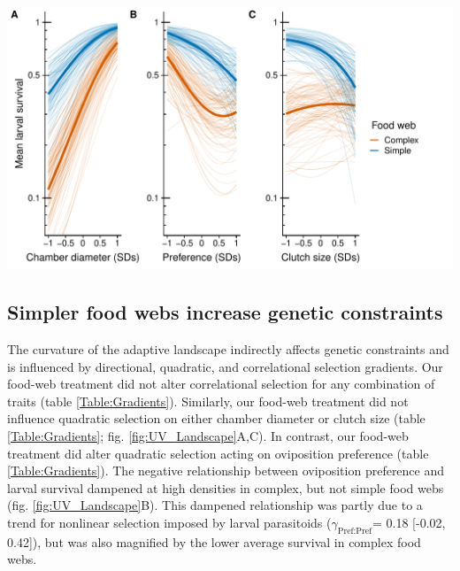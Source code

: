 \documentclass[11pt,]{article}
\let\origfigure\figure
\let\endorigfigure\endfigure
\renewenvironment{figure}[1][2] {
    \expandafter\origfigure\expandafter[H]
} {
    \endorigfigure
}
\begin{document}
\begin{figure}
\centering
\includegraphics{analyses/UV_landscapes.pdf}
\caption{\label{fig:UV_Landscape}Adaptive landscape of gall midge
phenotypes in complex vs.~simple food webs. Each panel corresponds to a
different phenotypic trait: chamber diameter (A); oviposition preference
(B); and clutch size (C). Bold lines represent selection experienced in
complex (orange) and simple (blue) food webs. Thin lines represent
bootstrapped replicates to show the uncertainty in selection. For
clarity, we only display 100 bootstraps even though inferences are based
on 1,000 replicates. Note that mean larval survival is plotted on a
natural log scale to reflect the mathematical defintion of the adaptive
landscape.}
\end{figure}

\subsection{Simpler food webs increase genetic
constraints}\label{simpler-food-webs-increase-genetic-constraints}

\indent The curvature of the adaptive landscape indirectly affects
genetic constraints and is influenced by directional, quadratic, and
correlational selection gradients. Our food-web treatment did not alter
correlational selection for any combination of traits (table
\ref{Table:Gradients}). Similarly, our food-web treatment did not
influence quadratic selection on either chamber diameter or clutch size
(table \ref{Table:Gradients}; fig. \ref{fig:UV_Landscape}A,C). In
contrast, our food-web treatment did alter quadratic selection acting on
oviposition preference (table \ref{Table:Gradients}). The negative
relationship between oviposition preference and larval survival dampened
at high densities in complex, but not simple food webs (fig.
\ref{fig:UV_Landscape}B). This dampened relationship was partly due to a
trend for nonlinear selection imposed by larval parasitoids
(\(\gamma_{\text{Pref:Pref}}\)= 0.18 {[}-0.02, 0.42{]}), but was also
magnified by the lower average survival in complex food webs.
\end{document}
